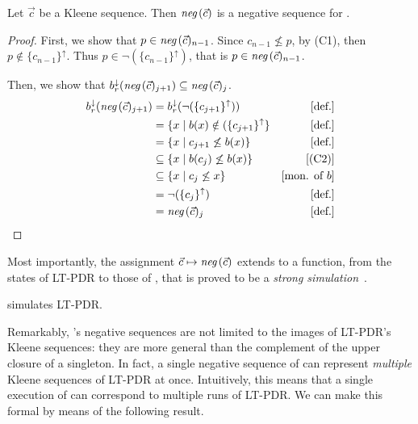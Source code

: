 \begin{prop}\label{prop:pdr:negLTPDR}
	Let $\vec{c}$ be a Kleene sequence. Then $\textit{neg}\,(\vec{c})$ is a negative sequence for {\ADPDR}.
\end{prop}
\begin{proof}
	First, we show that $p \in \textit{neg}\,(\vec{c})_{n-1}$. Since $c_{n-1}\not \le p$, by (C1), then $p \not\in \{c_{n-1}\}^\uparrow$. Thus $p \in \neg ( \{c_{n-1}\}^\uparrow)$, that is $p \in \textit{neg}\,(\vec{c})_{n-1}$.

	Then, we show that $b_r^\downarrow(\textit{neg}\,(\vec{c})_{j+1}) \subseteq \textit{neg}\,(\vec{c})_j$.
	\begin{align*}
		b_r^\downarrow(\textit{neg}\,(\vec{c})_{j+1}) & = b_r^\downarrow(\neg(\{c_{j+1}\}^\uparrow))    & [\text{def.}]       \\
		                                         & = \{x \mid b(x) \notin (\{c_{j+1}\}^\uparrow \} & [\text{def.}]       \\
		                                         & =  \{x \mid c_{j+1} \not \le b(x) \}            & [\text{def.}]       \\
		                                         & \subseteq  \{x \mid b(c_j) \not \le b(x) \}     & [\text{(C2)}]       \\
		                                         & \subseteq  \{x \mid c_j \not \le x \}           & [\text{mon. of } b] \\
		                                         & =  \neg(\{c_j\}^\uparrow)                       & [\text{def.}]       \\
		                                         & =  \textit{neg}\,(\vec{c})_j                         & [\text{def.}]
	\end{align*}
\end{proof}

Most importantly, the assignment $\vec{c} \mapsto \textit{neg}\,(\vec{c})$ extends to a function, from the states of LT-PDR to those of {\ADPDR}, that is proved to be a \emph{strong simulation}~\cite{Milner89}.

\begin{theorem}\label{th:pdr:LT-PDR-instance-ADPDR}
	\emph{\ADPDR} simulates LT-PDR.
\end{theorem}

Remarkably, {\ADPDR}'s negative sequences are not limited to the images of LT-PDR's Kleene sequences: they are more general  than the complement of the upper closure of a singleton. In fact, a single negative sequence of {\ADPDR} can represent \emph{multiple} Kleene sequences of LT-PDR at once. Intuitively, this means that a single execution of {\ADPDR} can correspond to multiple runs of LT-PDR. We can make this formal by means of the following result.

